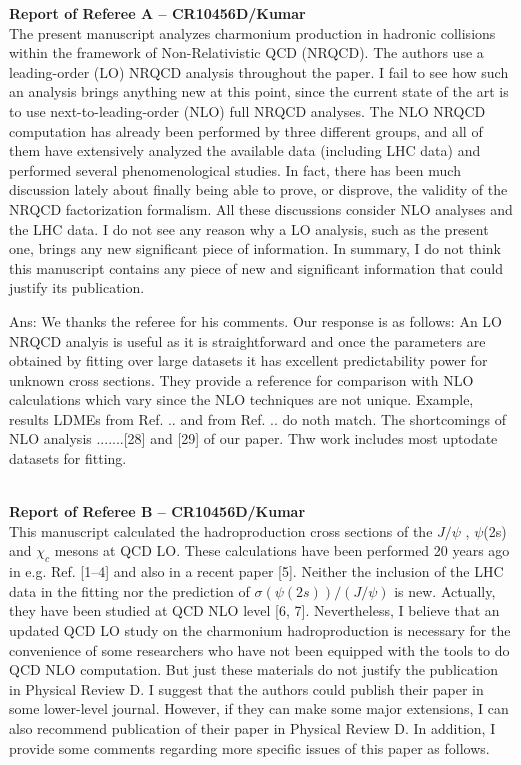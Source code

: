 \documentclass[aps,prc,preprint]{revtex4}
\begin{document}
{\bf Report of Referee A -- CR10456D/Kumar } \\


The present manuscript analyzes charmonium production in hadronic collisions
within the framework of Non-Relativistic QCD (NRQCD). The authors use a
leading-order (LO) NRQCD analysis throughout the paper. I fail to see how such
an analysis brings anything new at this point, since the current state of the
art is to use next-to-leading-order (NLO) full NRQCD analyses. The NLO NRQCD
computation has already been performed by three different groups, and all of
them have extensively analyzed the available data (including LHC data) and
performed several phenomenological studies. In fact, there has been much
discussion lately about finally being able to prove, or disprove, the validity
of the NRQCD factorization formalism. All these discussions consider NLO
analyses and the LHC data. I do not see any reason why a LO analysis, such as
the present one, brings any new significant piece of information. In summary, I
do not think this manuscript contains any piece of new and significant
information that could justify its publication.

Ans: We thanks the referee for his comments. Our response is as follows:
 An LO NRQCD analyis is useful as it is straightforward and once
the parameters are obtained by fitting over large datasets it has excellent 
predictability power for unknown cross sections. They provide a reference
for comparison with NLO calculations which vary since the NLO techniques are
not unique. Example, results LDMEs from Ref. .. and from Ref. .. do noth 
match.
 The shortcomings of NLO analysis .......[28] and [29] of our paper.
 Thw work includes most uptodate datasets for fitting.

\ \\

{\bf Report of Referee B -- CR10456D/Kumar} \\


This manuscript calculated the hadroproduction cross sections of the 
$J/\psi$ ,  $\psi$(2s) and $\chi_c$ mesons at QCD LO. These calculations have been 
performed 20 years ago in e.g. Ref. [1–4] and also in a recent paper [5]. Neither 
the inclusion of the LHC data in the fitting nor the prediction of 
$\sigma(\psi(2s))/(J/\psi)$ is new.  Actually, they have been studied at QCD NLO
level [6, 7]. Nevertheless, I believe that an updated QCD LO study on the charmonium
hadroproduction is necessary for the convenience of some researchers who have not been
equipped with the tools to do QCD NLO computation. But just these materials do not
justify the publication in Physical Review D. I suggest that the authors could publish 
their paper in some lower-level journal. However, if they can make some major 
extensions, I can also recommend publication of their paper in Physical Review D.
 In addition, I provide some comments regarding more specific issues of this paper 
as follows.
\end{document}

